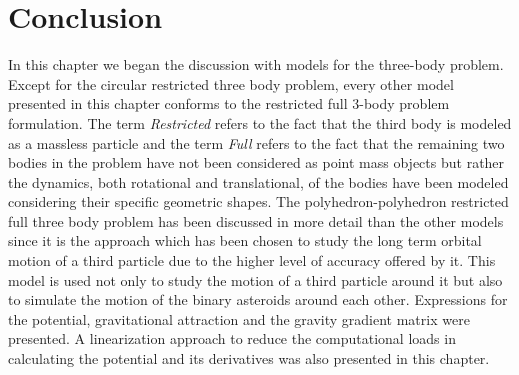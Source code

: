 \section{Conclusion}
In this chapter we began the discussion with models for the three-body problem. Except for the circular restricted three body problem, every other model presented in this chapter conforms to the restricted full 3-body problem formulation. The term \textit{Restricted} refers to the fact that the third body is modeled as a massless particle and the term \textit{Full} refers to the fact that the remaining two bodies in the problem have not been considered as point mass objects but rather the dynamics, both rotational and translational, of the bodies have been modeled considering their specific geometric shapes. The polyhedron-polyhedron restricted full three body problem has been discussed in more detail than the other models since it is the approach which has been chosen to study the long term orbital motion of a third particle due to the higher level of accuracy offered by it. This model is used not only to study the motion of a third particle around it but also to simulate the motion of the binary asteroids around each other. Expressions for the potential, gravitational attraction and the gravity gradient matrix were presented. A linearization approach to reduce the computational loads in calculating the potential and its derivatives was also presented in this chapter.
